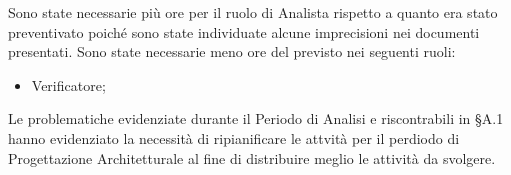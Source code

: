 Sono state necessarie più ore per il ruolo di Analista rispetto a quanto era stato preventivato poiché sono state individuate alcune imprecisioni nei documenti presentati.
\newline
Sono state necessarie meno ore del previsto nei seguenti ruoli:
\begin{itemize}
	\item Verificatore;
\end{itemize}
Le problematiche evidenziate durante il Periodo di Analisi e riscontrabili in §A.1 hanno evidenziato la necessità di ripianificare le attvità per il perdiodo di Progettazione Architetturale al fine di distribuire meglio le attività da svolgere. 